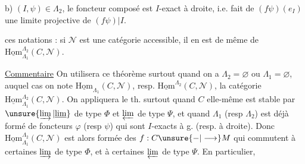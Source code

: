 b)  $(I,\psi)\in\Lambda_2$, le foncteur composé
est $I$-exact à droite, i.e. fait de $(f\psi)(e_I)$ une limite projective de $(f\psi)|I$.

 ces  notations : si $\mathcal N$ est une catégorie accessible, il en est de même de $\underline{\mathrm{Hom}}_{\Lambda_1}^{\Lambda_2}(C,\mathcal N)$.

\uline{Commentaire} On utilisera ce théorème surtout quand on a $\Lambda_2=\varnothing$ ou $\Lambda_1=\varnothing$, auquel cas on note $\underline{\mathrm{Hom}}_{\Lambda_1}(C,\mathcal N)$, resp. $\underline{\mathrm{Hom}}^{\Lambda_2}(C,\mathcal N)$, la catégorie $\underline{\mathrm{Hom}}_{\Lambda_1}^{\Lambda_2}(C,\mathcal N)$.  On appliquera le th. surtout quand $C$ elle-même est stable par $\unsure{\varinjlim|\underline{\lim}}$ de type $\Phi$ et  $\varprojlim$ de type $\Psi$, et quand  $\Lambda_1$ (resp $\Lambda_2$) est déjà formé de foncteurs $\varphi$ (resp $\psi$) qui sont $I$-exacts à g. (resp. à droite). Donc $\underline{\mathrm{Hom}}_{\Lambda_1}^{\Lambda_2}(C,\mathcal N)$ est alors formée des $f:C\unsure{-|\longrightarrow}M$ qui commutent à certaines $\varinjlim$ de type $\Phi$, et à certaines $\varprojlim$ de type $\Psi$. En particulier, 
